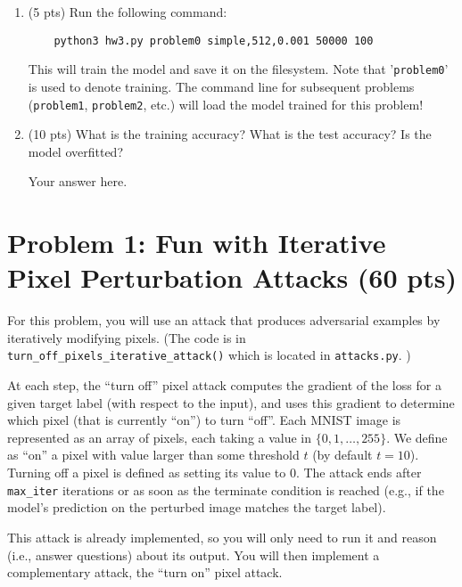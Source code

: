 \begin{enumerate}
	\item (5 pts) Run the following command:
\begin{Verbatim}
	python3 hw3.py problem0 simple,512,0.001 50000 100
\end{Verbatim}
	
	This will train the model and save it on the filesystem. Note that '\texttt{problem0}' is used to denote training. The command line for subsequent problems (\texttt{problem1}, \texttt{problem2}, etc.) will load the model trained for this problem!
	
	\item (10 pts) What is the training accuracy? What is the test accuracy? Is the model overfitted?

	\begin{answer}
	
		Your answer here.
		
	\end{answer}
	
\end{enumerate}

\newpage
\section*{Problem 1: Fun with Iterative Pixel Perturbation Attacks (60 pts)}
%

For this problem, you will use an attack that produces adversarial examples by iteratively modifying pixels. (The code is in \texttt{turn\_off\_pixels\_iterative\_attack()} which is located in \texttt{attacks.py}. )

At each step, the ``turn off'' pixel attack computes the gradient of the loss for a given target label (with respect to the input), and uses this gradient to determine which pixel (that is currently ``on'') to turn ``off''. Each MNIST image is represented as an array of pixels, each taking a value in $\{0, 1, \ldots, 255\}$. We define as ``on'' a pixel with value larger than some threshold $t$ (by default $t=10$). Turning off a pixel is defined as setting its value to $0$. The attack ends after \texttt{max\_iter} iterations or as soon as the terminate condition is reached (e.g., if the model's prediction on the perturbed image matches the target label).
 
This attack is already implemented, so you will only need to run it and reason (i.e., answer questions) about its output. You will then implement a complementary attack, the ``turn on'' pixel attack.

